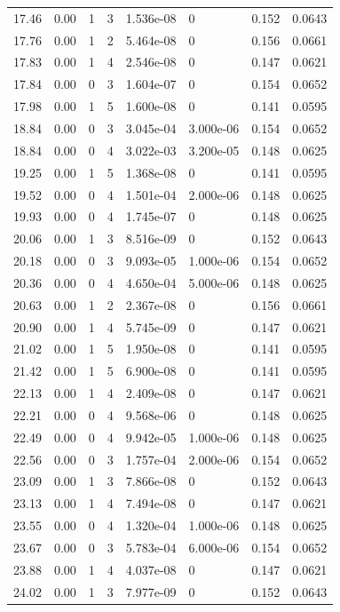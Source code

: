 \documentclass[preview]{standalone}
\begin{document}
{{{\begin{tabular}{L{1.2cm}C{1.2cm} C{0.3cm}C{0.5cm} C{1.4cm}C{1.4cm} C{1.4cm}C{1.4cm}}
  17.46  &  0.00  & 1     &  3 &  1.536e-08  & 0  & 0.152 &  0.0643   \\ 
  17.76  &  0.00  & 1     &  2 &  5.464e-08  & 0  & 0.156 &  0.0661   \\ 
  17.83  &  0.00  & 1     &  4 &  2.546e-08  & 0  & 0.147 &  0.0621   \\ 
  17.84  &  0.00  & 0     &  3 &  1.604e-07  & 0  & 0.154 &  0.0652   \\ 
  17.98  &  0.00  & 1     &  5 &  1.600e-08  & 0  & 0.141 &  0.0595   \\ 
  18.84  &  0.00  & 0     &  3 &  3.045e-04  & 3.000e-06  & 0.154 &  0.0652   \\ 
  18.84  &  0.00  & 0     &  4 &  3.022e-03  & 3.200e-05  & 0.148 &  0.0625   \\ 
  19.25  &  0.00  & 1     &  5 &  1.368e-08  & 0  & 0.141 &  0.0595   \\ 
  19.52  &  0.00  & 0     &  4 &  1.501e-04  & 2.000e-06  & 0.148 &  0.0625   \\ 
  19.93  &  0.00  & 0     &  4 &  1.745e-07  & 0  & 0.148 &  0.0625   \\ 
  20.06  &  0.00  & 1     &  3 &  8.516e-09  & 0  & 0.152 &  0.0643   \\ 
  20.18  &  0.00  & 0     &  3 &  9.093e-05  & 1.000e-06  & 0.154 &  0.0652   \\ 
  20.36  &  0.00  & 0     &  4 &  4.650e-04  & 5.000e-06  & 0.148 &  0.0625   \\ 
  20.63  &  0.00  & 1     &  2 &  2.367e-08  & 0  & 0.156 &  0.0661   \\ 
  20.90  &  0.00  & 1     &  4 &  5.745e-09  & 0  & 0.147 &  0.0621   \\ 
  21.02  &  0.00  & 1     &  5 &  1.950e-08  & 0  & 0.141 &  0.0595   \\ 
  21.42  &  0.00  & 1     &  5 &  6.900e-08  & 0  & 0.141 &  0.0595   \\ 
  22.13  &  0.00  & 1     &  4 &  2.409e-08  & 0  & 0.147 &  0.0621   \\ 
  22.21  &  0.00  & 0     &  4 &  9.568e-06  & 0  & 0.148 &  0.0625   \\ 
  22.49  &  0.00  & 0     &  4 &  9.942e-05  & 1.000e-06  & 0.148 &  0.0625   \\ 
  22.56  &  0.00  & 0     &  3 &  1.757e-04  & 2.000e-06  & 0.154 &  0.0652   \\ 
  23.09  &  0.00  & 1     &  3 &  7.866e-08  & 0  & 0.152 &  0.0643   \\ 
  23.13  &  0.00  & 1     &  4 &  7.494e-08  & 0  & 0.147 &  0.0621   \\ 
  23.55  &  0.00  & 0     &  4 &  1.320e-04  & 1.000e-06  & 0.148 &  0.0625   \\ 
  23.67  &  0.00  & 0     &  3 &  5.783e-04  & 6.000e-06  & 0.154 &  0.0652   \\ 
  23.88  &  0.00  & 1     &  4 &  4.037e-08  & 0  & 0.147 &  0.0621   \\ 
  24.02  &  0.00  & 1     &  3 &  7.977e-09  & 0  & 0.152 &  0.0643   \\ 
\hline 
\end{tabular} 

}}}
\end{document}
